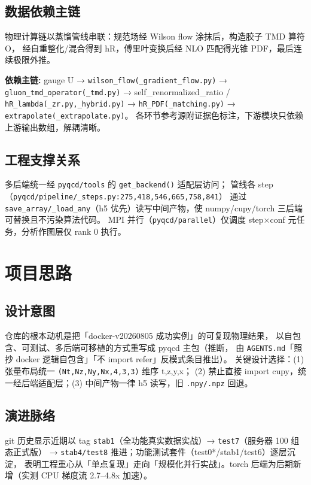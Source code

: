 \documentclass[UTF8]{ctexart}
\begin{document}
\subsection{数据依赖主链}
物理计算链以蒸馏管线串联：规范场经 Wilson flow 涂抹后，构造胶子 TMD 算符 O，
经自重整化/混合得到 hR，傅里叶变换后经 NLO 匹配得光锥 PDF，最后连续极限外推。
\begin{keybox}
\textbf{依赖主链:} \textcolor{relation}{gauge U → \nolinkurl{wilson_flow(_gradient_flow.py)} → \nolinkurl{gluon_tmd_operator(_tmd.py)} → self\_renormalized\_ratio / \nolinkurl{hR_lambda(_zr.py,_hybrid.py)} → \nolinkurl{hR_PDF(_matching.py)} → \nolinkurl{extrapolate(_extrapolate.py)}}。
各环节参考源附证据色标注，下游模块只依赖上游输出数组，解耦清晰。
\end{keybox}

\subsection{工程支撑关系}
多后端统一经 \texttt{pyqcd/tools} 的 \texttt{get\_backend()} 适配层访问；
管线各 step（\nolinkurl{pyqcd/pipeline/_steps.py:275,418,546,665,758,841}）
通过 \texttt{save\_array/\_load\_any}（h5 优先）读写中间产物，使 numpy/cupy/torch 三后端可替换且不污染算法代码。
MPI 并行（\texttt{pyqcd/parallel}）仅调度 step×conf 元任务，分析作图层仅 rank 0 执行。

\section{项目思路}
\subsection{设计意图}
仓库的根本动机是把「docker-v20260805 成功实例」的可复现物理结果，
以自包含、可测试、多后端可移植的方式重写成 pyqcd 主包（\textcolor{idea}{推断}，
由 \texttt{AGENTS.md}「照抄 docker 逻辑自包含」「不 import refer」反模式条目推出）。
关键设计选择：(1) 张量布局统一 \texttt{(Nt,Nz,Ny,Nx,4,3,3)} 维序 t,z,y,x；
(2) 禁止直接 import cupy，统一经后端适配层；(3) 中间产物一律 h5 读写，旧 \texttt{.npy/.npz} 回退。

\subsection{演进脉络}
git 历史显示近期以 tag \texttt{stab1}（全功能真实数据实战）→ \texttt{test7}（服务器 100 组态正式版）
→ \texttt{stab4/test8} 推进；功能测试套件（test0*/stab1/test6）逐层沉淀，
表明工程重心从「单点复现」走向「规模化并行实战」。torch 后端为后期新增（实测 CPU 梯度流 2.7–4.8x 加速）。
\end{document}
